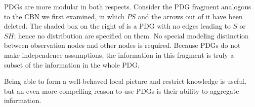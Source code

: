 \documentclass{article}
\newcommand{\MN}{PDG}
\numberwithin{equation}{section}
\begin{document}
\begin{example}[restriction]
               PDGs are more modular in both respects.
			Consider the PDG fragment analogous to the CBN we first examined,
            in which $\mathit{PS}$ and the arrows out of it have
                been deleted. The shaded box on the right of
 is a PDG with
                no edges leading to $S$ or 
                $\mathit{SH}$; hence no distribution are specified on
                them.  No special modeling distinction between
                observation nodes and other nodes is required.  
		Because PDGs do not make independence assumptions, the
                information in this fragment is truly a subset of the
                information in the whole \MN. 		 
	\end{example}

 	Being able to form a well-behaved local picture and restrict
        knowledge is useful, but an even more compelling 
        reason to use PDGs is their ability to aggregate information. 
	
\end{document}
